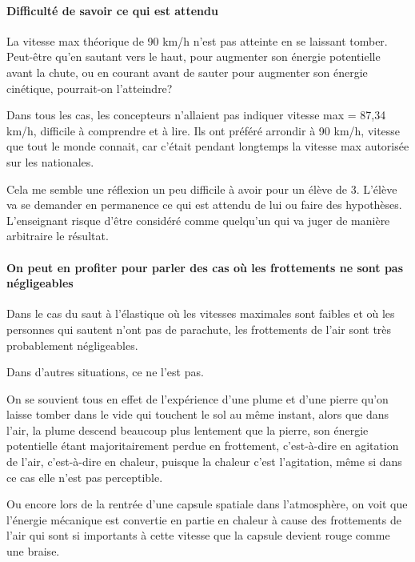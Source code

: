 \paragraph{Difficulté de savoir ce qui est attendu}
La vitesse max théorique de 90 km/h n'est pas atteinte en se laissant tomber. Peut-être qu'en sautant vers le haut, pour augmenter son énergie potentielle avant la chute, ou en courant avant de sauter pour augmenter son énergie cinétique, pourrait-on l'atteindre?

Dans tous les cas, les concepteurs n'allaient pas indiquer vitesse max = 87,34 km/h, difficile à comprendre et à lire. Ils ont préféré arrondir à 90 km/h, vitesse que tout le monde connait, car c'était pendant longtemps la vitesse max autorisée sur les nationales.

Cela me semble une réflexion un peu difficile à avoir pour un élève de 3\ieme{}. L'élève va se demander en permanence ce qui est attendu de lui ou faire des hypothèses. L'enseignant risque d'être considéré comme quelqu'un qui va juger de manière arbitraire le résultat.

\paragraph{On peut en profiter pour parler des cas où les frottements ne sont pas négligeables}
Dans le cas du saut à l'élastique où les vitesses maximales sont faibles et où les personnes qui sautent n'ont pas de parachute, les frottements de l'air sont très probablement négligeables. 

Dans d'autres situations, ce ne l'est pas.

On se souvient tous en effet de l'expérience d'une plume et d'une pierre qu'on laisse tomber dans le vide qui touchent le sol au même instant, alors que dans l'air, la plume descend beaucoup plus lentement que la pierre, son énergie potentielle étant majoritairement perdue en frottement, c'est-à-dire en agitation de l'air, c'est-à-dire en chaleur, puisque la chaleur c'est l'agitation, même si dans ce cas elle n'est pas perceptible.

Ou encore lors de la rentrée d'une capsule spatiale dans l'atmosphère, on voit que l'énergie mécanique est convertie en partie en chaleur à cause des frottements de l'air qui sont si importants à cette vitesse que la capsule devient rouge comme une braise.